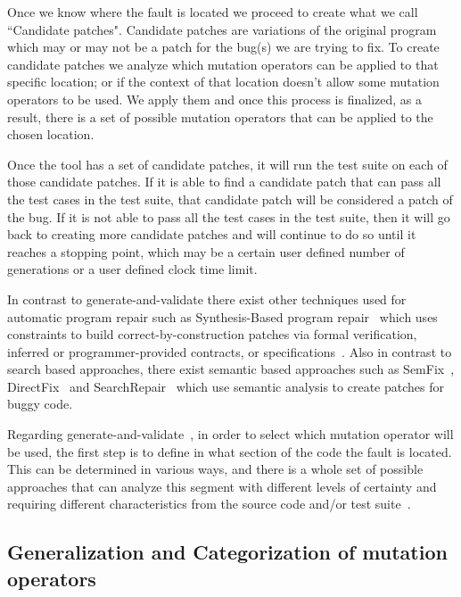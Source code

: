 \documentclass[conference]{IEEEtran}
\begin{document}
Once we know where the fault is located we proceed to create what we call 
``Candidate patches". Candidate patches are variations of the original program 
which may or may not be a patch for the bug(s) we are trying to fix. To 
create candidate patches we analyze which mutation operators can
be applied to that specific location; or if the context of that location doesn't
allow some mutation operators to be used. We apply them and once this process is finalized, as a result, there is a set of possible 
mutation operators that
can be applied to the chosen location.

Once the tool has a set of candidate patches, it will run the test suite on each 
of those candidate patches. If it is able to find a candidate patch that can 
pass all the test cases in the test suite, that candidate patch will be 
considered a patch of the bug. If it is not able to pass all the test cases in 
the test suite, then it will go back to creating more candidate patches and will 
continue to do so until it reaches a stopping point, which may be a certain user 
defined number of generations or a user defined clock time limit.

In contrast to generate-and-validate there exist other techniques used for 
automatic program repair such as Synthesis-Based program 
repair~\cite{jin11,pei14} which uses constraints to build 
correct-by-construction patches via formal verification, inferred or 
programmer-provided contracts,
or specifications~\cite{jin11,wei10}. Also in contrast to search based approaches, there exist semantic based approaches such as SemFix~\cite{nguyen13}, DirectFix~\cite{mechtaev15} and SearchRepair~\cite{ke15} which use semantic analysis to create patches for buggy code.

Regarding generate-and-validate~\cite{legoues12}, in
order to select which mutation operator will be used, the 
first step is to define in what section of the code the fault is located. This can be determined in various ways, and 
there is 
a whole set of
possible approaches that can analyze this segment with different levels of certainty and 
requiring different characteristics from the source code and/or test 
suite~\cite{Jones05,Jones02,Chen02,legoues12,Qi13,Qi2013,Abreu07,wong09}. 

\subsection{Generalization and Categorization of mutation operators} 
\label{categorization}
\end{document}
